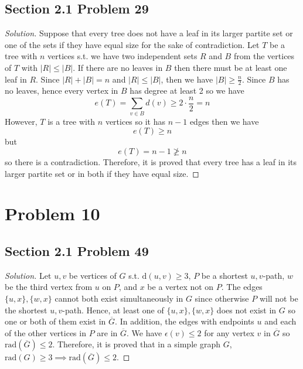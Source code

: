 \documentclass[12pt]{article}
\newenvironment*{solution}{\begin{proof}[Solution]}{\end{proof}}
\begin{document}
\subsection*{Section 2.1 Problem 29}
\begin{solution}
    Suppose that every tree does not have a leaf in its larger partite set or
    one of the sets if they have equal size for the sake of contradiction. Let
    \(T\) be a tree with \(n\) vertices s.t. we have two independent sets \(R
    \) and \(B\) from the vertices of \(T\) with \(|R|\leq|B|\). If there are
    no leaves in \(B\) then there must be at least one leaf in \(R\). Since \(
    |R|+|B|=n\) and \(|R|\leq|B|\), then we have \(|B|\geq\frac{n}{2}\). Since
    \(B\) has no leaves, hence every vertex in \(B\) has degree at least 2 so
    we have \[e(T)=\sum_{v\in B}d(v)\geq2\cdot\frac{n}{2}=n\]However, \(T\) is
    a tree with \(n\) vertices so it has \(n-1\) edges then we have \[e(T)\geq
    n\] but \[e(T)=n-1\not\geq n\] so there is a contradiction. Therefore, it
    is proved that every tree has a leaf in its larger partite set or in both
    if they have equal size.
\end{solution}
\section*{Problem 10}
\subsection*{Section 2.1 Problem 49}
\begin{solution}
    Let \(u,v\) be vertices of \(G\) s.t. \(\textrm{d}(u,v)\geq3\), \(P\) be a
    shortest \(u,v\)-path, \(w\) be the third vertex from \(u\) on \(P\), and
    \(x\) be a vertex not on \(P\). The edges \(\{u,x\},\{w,x\}\) cannot both
    exist simultaneously in \(G\) since otherwise \(P\) will not be the
    shortest \(u,v\)-path. Hence, at least one of \(\{u,x\},\{w,x\}\) does not
    exist in \(G\) so one or both of them exist in \(\overline{G}\). In
    addition, the edges with endpoints \(u\) and each of the other vertices in
    \(P\) are in \(\overline{G}\). We have \(\epsilon(v)\leq2\) for any vertex
    \(v\) in \(\overline{G}\) so \(\textrm{rad}(\overline{G})\leq2\).
    Therefore, it is proved that in a simple graph \(G\), \(\textrm{rad}(G)
    \geq3\implies\textrm{rad}(\overline{G})\leq2\).
\end{solution}
\end{document}
